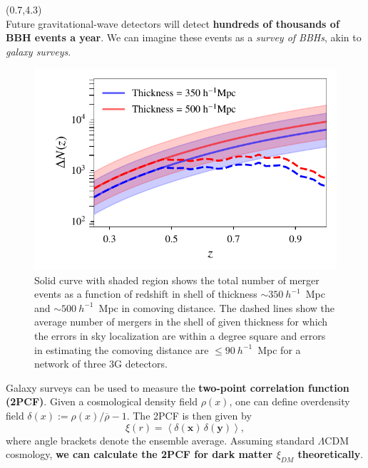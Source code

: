 \documentclass[a1,portrait]{a1poster}
\newcommand{\headingcolor}{\color{BannerElevenColor}}
\newcommand{\x}{\mathbf{x}}
\newcommand{\y}{\mathbf{y}}
\def\LHead#1{\noindent{\LARGE \headingcolor #1}\smallskip}
\begin{document}
\begin{textblock}{7.3}(0.7,4.3)	%
\LHead{Introduction}\\
Future gravitational-wave detectors will detect \textbf{hundreds of thousands of BBH events a year}. We can imagine these events as a \textit{survey of BBHs}, akin to \textit{galaxy surveys}.

\begin{figure}
	\centering
	\includegraphics[scale=1.8]{Nz_vs_z.pdf}
	\caption{\small{Solid curve with shaded region shows the total number of merger events as a function of redshift in shell of thickness $\sim 350~h^{-1}$~Mpc and $\sim 500~h^{-1}$~Mpc in comoving distance. The dashed lines show the average number of mergers in the shell of given thickness for which the errors in sky localization are within a degree square and errors in estimating the comoving distance are $\le 90~h^{-1}$~Mpc for a network of three 3G detectors.}} 
	\label{fig:mergers_events}
\end{figure}
Galaxy surveys can be used to measure the \textbf{two-point correlation function (2PCF)}. Given a cosmological density field $ \rho(x) $, one can define overdensity field $\delta(x) := \rho(x) / \overline{\rho} - 1$.
The 2PCF is  then given by
\begin{equation}
\xi({r}) = \left<\delta(\x) \, \delta(\y)\right> \label{corrfunc},
\end{equation}
where angle brackets denote the ensemble average. Assuming standard $ \Lambda $CDM cosmology, \textbf{we can calculate the 2PCF for dark matter $ \xi_{DM} $ theoretically}.\\


\end{textblock}
\end{document}
